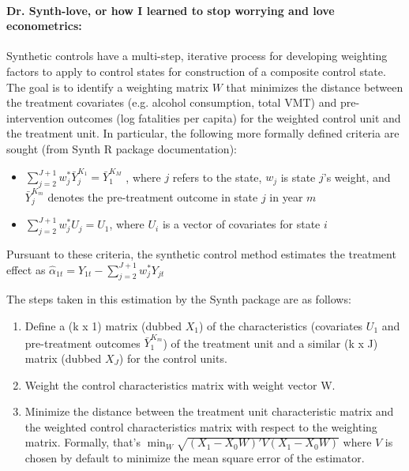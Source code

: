 \documentclass[letterpaper, 12pt]{article}
\begin{document}
\paragraph{Dr. Synth-love, or how I learned to stop worrying and love econometrics:}
Synthetic controls have a multi-step, iterative process for developing weighting factors to apply to control states for construction of a composite control state.  The goal is to identify a weighting matrix $W$ that minimizes the distance between the treatment covariates (e.g. alcohol consumption, total VMT) and pre-intervention outcomes (log fatalities per capita) for the weighted control unit and the treatment unit. In particular, the following more formally defined criteria are sought (from Synth R package documentation):
\begin{itemize}
\item $\sum_{j=2}^{J+1} w_j^* \bar{Y}_j^{K_1} = \bar{Y}_1^{K_M}$ , where $j$ refers to the state, $w_j$ is state $j$'s weight, and $\bar{Y}_j^{K_m}$ denotes the pre-treatment outcome in state $j$ in year $m$
\item $\sum_{j=2}^{J+1} w_j^* U_j = U_1$, where $U_i$ is a vector of covariates for state $i$
\end{itemize}

Pursuant to these criteria, the synthetic control method estimates the treatment effect as $\hat{\alpha}_{1t} = Y_{1t} - \sum_{j=2}^{J+1} w_j^* Y_{jt}$

The steps taken in this estimation by the Synth package are as follows:
\begin{enumerate}
\item Define a (k x 1) matrix (dubbed $X_1$) of the characteristics (covariates $U_1$ and pre-treatment outcomes $\bar{Y}_1^{K_m}$) of the treatment unit and a similar (k x J) matrix (dubbed $X_J$) for the control units.
\item Weight the control characteristics matrix with weight vector W.
\item Minimize the distance between the treatment unit characteristic matrix and the weighted control characteristics matrix with respect to the weighting matrix. Formally, that's $\min_{W} \sqrt{(X_1 - X_0W)'V(X_1-X_0W)}$ where $V$ is chosen by default to minimize the mean square error of the estimator.
\end{enumerate}
\end{document}
